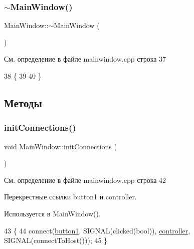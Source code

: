 \hypertarget{class_main_window_ae98d00a93bc118200eeef9f9bba1dba7}{}\label{class_main_window_ae98d00a93bc118200eeef9f9bba1dba7} 
\subsubsection{\texorpdfstring{$\sim$\+Main\+Window()}{~MainWindow()}}
{\footnotesize\ttfamily Main\+Window\+::$\sim$\+Main\+Window (\begin{DoxyParamCaption}{ }\end{DoxyParamCaption})}



См. определение в файле mainwindow.\+cpp строка 37


\begin{DoxyCode}
38 \{
39 
40 \}
\end{DoxyCode}


\subsection{Методы}
\hypertarget{class_main_window_aecba599b372d9fdf89dfbc1f4a060019}{}\label{class_main_window_aecba599b372d9fdf89dfbc1f4a060019} 
\subsubsection{\texorpdfstring{init\+Connections()}{initConnections()}}
{\footnotesize\ttfamily void Main\+Window\+::init\+Connections (\begin{DoxyParamCaption}{ }\end{DoxyParamCaption})}



См. определение в файле mainwindow.\+cpp строка 42



Перекрестные ссылки button1 и controller.



Используется в Main\+Window().


\begin{DoxyCode}
43 \{
44     connect(\hyperlink{class_main_window_a96ee7d6a31dd131de9220930822f9da7}{button1}, SIGNAL(clicked(\textcolor{keywordtype}{bool})), \hyperlink{class_main_window_af1f864005894311612c0b9174f82db8a}{controller}, SIGNAL(connectToHost()));
45 \}
\end{DoxyCode}


